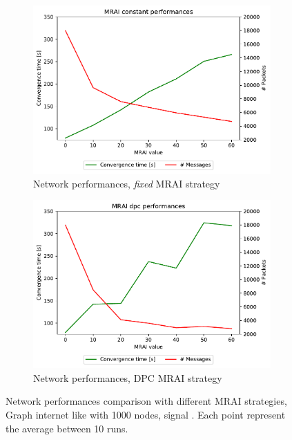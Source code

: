 \begin{figure}[h]
     \centering
     \begin{subfigure}[b]{0.49\textwidth}
         \centering
         \includegraphics[width=\textwidth]{images/internet_like/1000/signals/AWA/constant/internet_like-constant_AWA_mrai_evolution.pdf}
		 \caption{Network performances, \textit{fixed} \ac{MRAI} strategy}
         \label{fig:internet_like_1000_fixed_AWA}
     \end{subfigure}
     \hfill
     \begin{subfigure}[b]{0.49\textwidth}
         \centering
         \includegraphics[width=\textwidth]{images/internet_like/1000/signals/AWA/dpc/internet_like-DPC_AWA_mrai_evolution.pdf}
		 \caption{Network performances, \ac{DPC} \ac{MRAI} strategy}
         \label{fig:internet_like_1000_dpc_AWA}
     \end{subfigure}
	 \caption{Network performances comparison with different \ac{MRAI} strategies,
		Graph internet like with \num{1000} nodes, signal . Each point
		represent the average between \num{10} runs.}
        \label{fig:internt_like_1000_evolution_AWA}
\end{figure}

